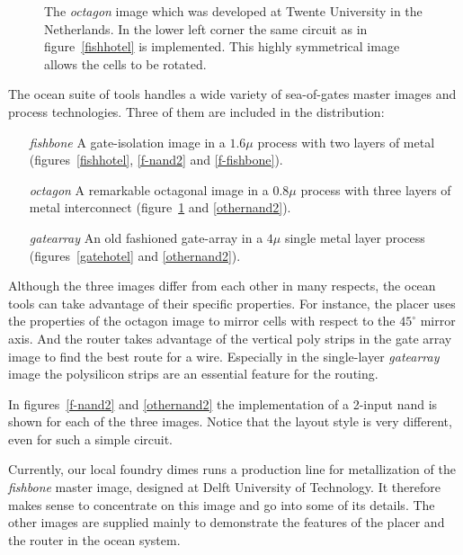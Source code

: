 \begin{figure}
\centerline{}
\caption{The {\em octagon} image which was developed at Twente University in
the Netherlands. In the lower left corner the same circuit as
in figure~\protect\ref{fishhotel} is implemented. This highly symmetrical image
allows the cells to be rotated.}
\label{octagonhotel}
\end{figure}

The {\sc ocean} suite of tools handles a wide variety of sea-of-gates master
images and process technologies. Three of them are included in the
distribution:
\begin{itemize}
\item[{\em fishbone}]
A gate-isolation image in a $1.6 \mu$  process with two layers of metal
(figures~\ref{fishhotel}, \ref{f-nand2} and \ref{f-fishbone}).
\item[{\em octagon}]
A remarkable octagonal image in a $0.8 \mu$  process with three layers
of metal interconnect (figure~\ref{octagonhotel} and \ref{othernand2}).
\item[{\em gatearray}]
An old fashioned gate-array in a $4 \mu$ single metal layer  process
(figures~\ref{gatehotel} and \ref{othernand2}).
\end{itemize}

Although the three images differ from each other in many
respects, the {\sc ocean} tools can take advantage of their specific
properties.  For instance, the placer  uses the
properties of the octagon image to mirror cells with respect to the $45^\circ$
mirror axis. And the router  takes advantage of the vertical poly
strips in the gate array image to find the best route for a wire.
Especially in the single-layer {\em gatearray} image the polysilicon strips are
an essential feature for the routing.

In figures~\ref{f-nand2} and \ref{othernand2} the implementation of a 2-input
nand is shown for each of the three images. Notice that the layout style is
very different, even for such a simple circuit.

Currently, our local foundry {\sc dimes} runs a production line for
metallization of the {\sl fishbone} master image, designed at Delft University
of Technology. It therefore makes sense to concentrate on this image and go
into some of its details. The other images are supplied mainly to demonstrate
the features of the placer and the router in the {\sc ocean} system.

